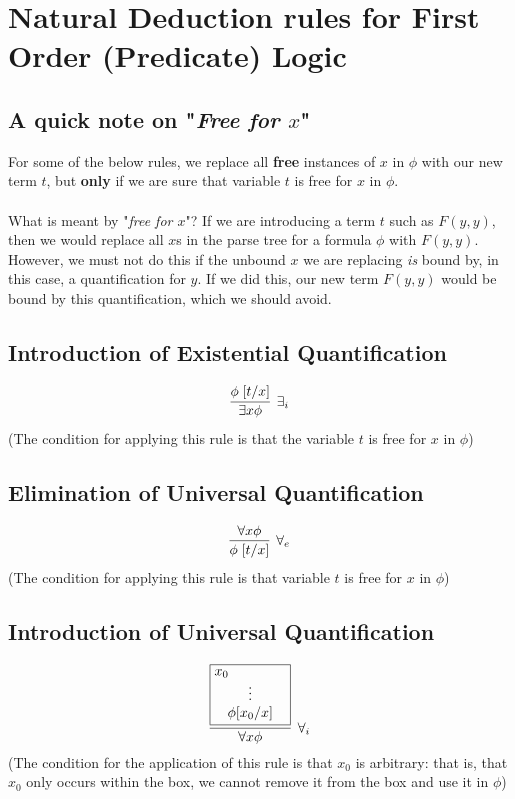 \documentclass{article}
\newcommand{\rulename}[1]{#1}
\newcommand{\hint}[1]{#1}
\newcommand{\myex}[2]{\exists #1 #2}
\newcommand{\myall}[2]{\forall #1 #2}
\begin{document}
\section*{Natural Deduction rules for First Order (Predicate) Logic}

  \subsection*{A quick note on "\textit{Free for $x$}"}
For some of the below rules, we replace all \textbf{free} instances of $x$ in $\phi$ with our new term $t$, but \textbf{only} if we are sure that variable $t$ is free for $x$ in $\phi$. 
    \\\\What is meant by "\textit{free for $x$}"? If we are introducing a term $t$ such as $F(y,y)$, then we would replace all $x$s in the parse tree for a formula $\phi$ with $F(y,y)$. However, we must not do this if the unbound $x$ we are replacing \textit{is} bound by, in this case, a quantification for $y$. If we did this, our new term $F(y,y)$ would be bound by this quantification, which we should avoid.
\subsection*{Introduction of Existential Quantification}
    \begin{align*}
      \infer[\rulename{\exists_i}]
      {\myex{x}{\phi}}
      {\phi\;[t/x]}
    \end{align*}
    (The condition for applying this rule is that the variable $t$ is free for $x$ in $\phi$) %

\subsection*{Elimination of Universal Quantification}
    \begin{align*}
      \infer[\rulename{\forall_e}]
      {\phi\;[t/x]}
      {\myall{x}{\phi}}
    \end{align*}
    (The condition for applying this rule is that variable $t$ is free for $x$ in $\phi$)
\subsection*{Introduction of Universal Quantification}
    \begin{equation*}
      \infer[\rulename{\forall_i}]
      {\forall x \phi}
      {
        \framebox{\parbox{1.8cm}{\hint{$x_0$}
        \centerline{\vdots}
        \centerline{$\phi[x_0/x]$}}}
      }
    \end{equation*}
    (The condition for the application of this rule is that $x_0$ is arbitrary: that is, that $x_0$ only occurs within the box, we cannot remove it from the box and use it in $\phi$)
    
\end{document}

